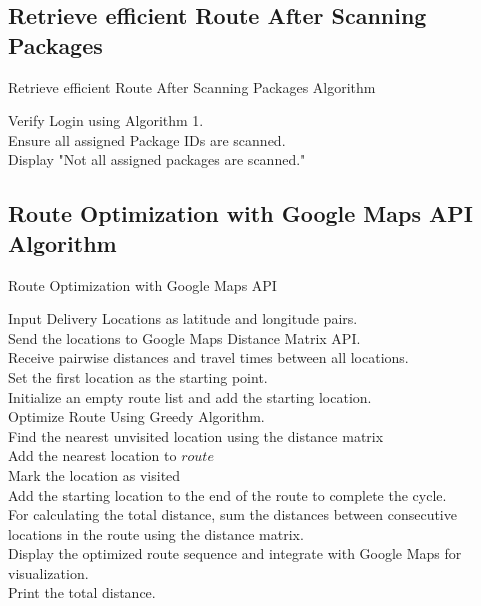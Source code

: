 \subsection{Retrieve efficient Route After Scanning Packages}
\begin{algorithm}[H]
\caption{Retrieve efficient Route After Scanning Packages Algorithm}
Verify Login using Algorithm 1.\\
Ensure all assigned Package IDs are scanned.\\
{Display "Not all assigned packages are scanned."}
\end{algorithm}
\newpage
\subsection{Route Optimization with Google Maps API Algorithm}
\begin{algorithm}
\caption{Route Optimization with Google Maps API}
Input Delivery Locations as latitude and longitude pairs.\\
Send the locations to Google Maps Distance Matrix API.\\
Receive pairwise distances and travel times between all locations.\\
Set the first location as the starting point.\\
Initialize an empty route list and add the starting location.\\
Optimize Route Using Greedy Algorithm.\\
{
    Find the nearest unvisited location using the distance matrix\\
    Add the nearest location to $route$\\
    Mark the location as visited\\
}
Add the starting location to the end of the route to complete the cycle.\\
For calculating the total distance, sum the distances between consecutive locations in the route using the distance matrix.\\
Display the optimized route sequence and integrate with Google Maps for visualization.\\
Print the total distance.\\
\end{algorithm}
